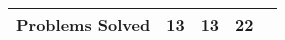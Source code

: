 \documentclass{sig-alternate}
\begin{document}
\begin{table}[t]
\begin{tabular}{lrrr|r}
\midrule
\rowcolor{white} Problems Solved          & 13       & 13      & 22 &   \\
\bottomrule
\end{tabular}
\end{table}
\end{document}
